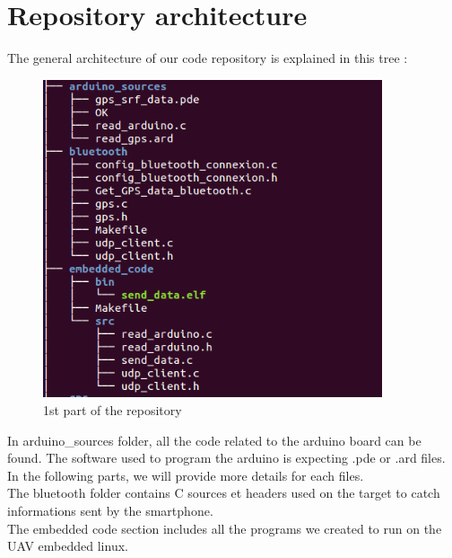 \section{Repository architecture}

The general architecture of our code repository is explained in this tree :\\

\begin{figure}[!h] 
\begin{center}
\includegraphics[width=10cm]{imgs/c1.png}
\caption{1st part of the repository} 
\label{img1} 
\end{center}
\end{figure} 

In arduino\_sources folder, all the code related to the arduino board can be found.
The software used to program the arduino is expecting .pde or .ard files.\\

In the following parts, we will provide more details for each files.\\

The bluetooth folder contains C sources et headers used on the target to catch informations sent by the smartphone.\\

The embedded code section includes all the programs we created to run on the UAV embedded linux.\\

\newpage

